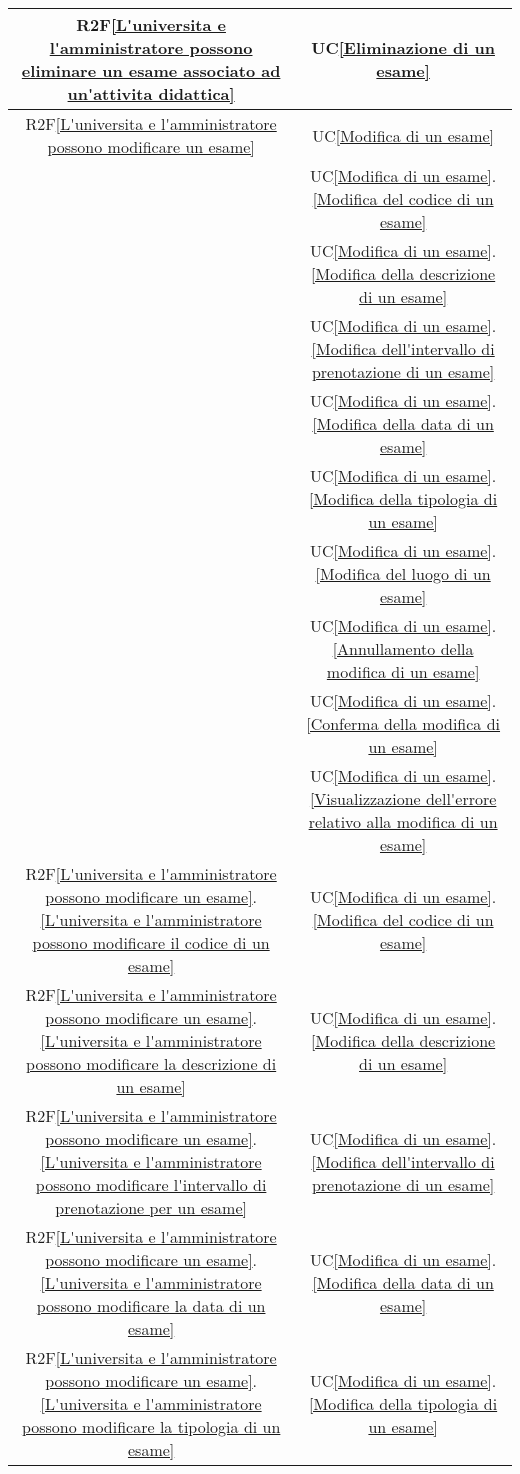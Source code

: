 \begin{longtable}{|c|c|}
\hline
R2F\ref{L'universita e l'amministratore possono eliminare un esame associato ad un'attivita didattica} & UC\ref{Eliminazione di un esame}\\
\hline
R2F\ref{L'universita e l'amministratore possono modificare un esame} & UC\ref{Modifica di un esame}\\
& UC\ref{Modifica di un esame}.\ref{Modifica del codice di un esame}\\
& UC\ref{Modifica di un esame}.\ref{Modifica della descrizione di un esame}\\
& UC\ref{Modifica di un esame}.\ref{Modifica dell'intervallo di prenotazione di un esame}\\
& UC\ref{Modifica di un esame}.\ref{Modifica della data di un esame}\\
& UC\ref{Modifica di un esame}.\ref{Modifica della tipologia di un esame}\\
& UC\ref{Modifica di un esame}.\ref{Modifica del luogo di un esame}\\
& UC\ref{Modifica di un esame}.\ref{Annullamento della modifica di un esame}\\
& UC\ref{Modifica di un esame}.\ref{Conferma della modifica di un esame}\\
& UC\ref{Modifica di un esame}.\ref{Visualizzazione dell'errore relativo alla modifica di un esame}\\
\hline
R2F\ref{L'universita e l'amministratore possono modificare un esame}.\ref{L'universita e l'amministratore possono modificare il codice di un esame} & UC\ref{Modifica di un esame}.\ref{Modifica del codice di un esame}\\
\hline
R2F\ref{L'universita e l'amministratore possono modificare un esame}.\ref{L'universita e l'amministratore possono modificare la descrizione di un esame} & UC\ref{Modifica di un esame}.\ref{Modifica della descrizione di un esame}\\
\hline
R2F\ref{L'universita e l'amministratore possono modificare un esame}.\ref{L'universita e l'amministratore possono modificare l'intervallo di prenotazione per un esame} & UC\ref{Modifica di un esame}.\ref{Modifica dell'intervallo di prenotazione di un esame}\\
\hline
R2F\ref{L'universita e l'amministratore possono modificare un esame}.\ref{L'universita e l'amministratore possono modificare la data di un esame} & UC\ref{Modifica di un esame}.\ref{Modifica della data di un esame}\\
\hline
R2F\ref{L'universita e l'amministratore possono modificare un esame}.\ref{L'universita e l'amministratore possono modificare la tipologia di un esame} & UC\ref{Modifica di un esame}.\ref{Modifica della tipologia di un esame}\\

\end{longtable}
